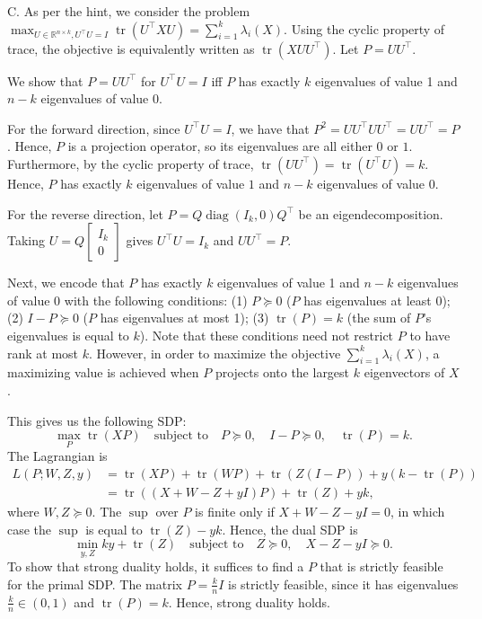 \documentclass[11pt,letterpaper]{article}
\theoremstyle{definition}
\newcommand{\reals}{\mathbb{R}}
\newcommand{\tr}{\operatorname{tr}}
\begin{document}
\bigskip

C.
As per the hint, we consider the problem $\max_{U \in \reals^{n \times k}, U^\top U = I} \operatorname{tr}(U^\top X U) = \sum_{i=1}^k \lambda_i(X)$.
Using the cyclic property of trace, the objective is equivalently written as $\operatorname{tr}(X U U^\top)$.
Let $P = U U^\top$. 

We show that $P = U U^\top$ for $U^\top U = I$ iff $P$ has exactly $k$ eigenvalues of value 1 and $n-k$ eigenvalues of value 0.

For the forward direction, since $U^\top U=I$, we have that $P^2 = U U^\top UU^\top = UU^\top = P$. Hence, $P$ is a projection operator, so its eigenvalues are all either $0$ or $1$.
Furthermore, by the cyclic property of trace, $\tr(U U^\top) = \tr(U^\top U) = k$. Hence, $P$ has exactly $k$ eigenvalues of value $1$ and $n-k$ eigenvalues of value $0$.

For the reverse direction, let $P = Q\operatorname{diag}(I_k,0)Q^\top$ be an eigendecomposition. Taking $U=Q\begin{bmatrix}I_k\\0\end{bmatrix}$ gives $U^\top U=I_k$ and $UU^\top=P$.

Next, we encode that $P$ has exactly $k$ eigenvalues of value 1 and $n-k$ eigenvalues of value 0 with the following conditions:
(1) $P\succeq 0$ ($P$ has eigenvalues at least 0); (2) $I-P\succeq 0$ ($P$ has eigenvalues at most 1); (3) $\tr(P) = k$ (the sum of $P$'s eigenvalues is equal to $k$).
Note that these conditions need not restrict $P$ to have rank at most $k$. However, in order to maximize the objective $\sum_{i=1}^k \lambda_i(X)$, a maximizing value is achieved when $P$ projects onto the largest $k$ eigenvectors of $X$. 

This gives us the following SDP:
\[
\max_{P} \operatorname{tr}(X P) \quad \text{subject to} \quad P \succeq 0, \quad I-P \succeq 0, \quad \operatorname{tr}(P) = k.
\]
The Lagrangian is 
\begin{align*}
  L(P;W,Z,y) &= \tr(XP) + \tr(WP) + \tr(Z(I-P)) + y(k-\tr(P)) \\
  &= \tr((X+W-Z+yI)P) + \tr(Z) + yk,
\end{align*}
where $W,Z\succeq 0$.
The $\sup$ over $P$ is finite only if $X+W-Z-yI = 0$, in which case the $\sup$ is equal to $\tr(Z) - yk$. Hence, the dual SDP is
\[
\min_{y,Z}  ky + \tr(Z) \quad \text{subject to} \quad Z\succeq 0, \quad X-Z-yI \succeq 0.
\]
To show that strong duality holds, it suffices to find a $P$ that is strictly feasible for the primal SDP.
The matrix $P = \frac{k}{n}I$ is strictly feasible, since it has eigenvalues $\frac{k}{n}\in(0,1)$ and $\tr(P) = k$. Hence, strong duality holds.
\end{document}
